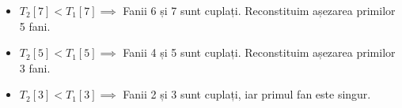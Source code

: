 \begin{itemize}

\item $T_2[7]<T_1[7] \implies$ Fanii 6 și 7 sunt cuplați. Reconstituim
  așezarea primilor 5 fani.

\item $T_2[5]<T_1[5] \implies$ Fanii 4 și 5 sunt cuplați. Reconstituim
  așezarea primilor 3 fani.

\item $T_2[3]<T_1[3] \implies$ Fanii 2 și 3 sunt cuplați, iar primul fan este
  singur.

\end{itemize}

\inputminted{c}{src/problem12.c}
